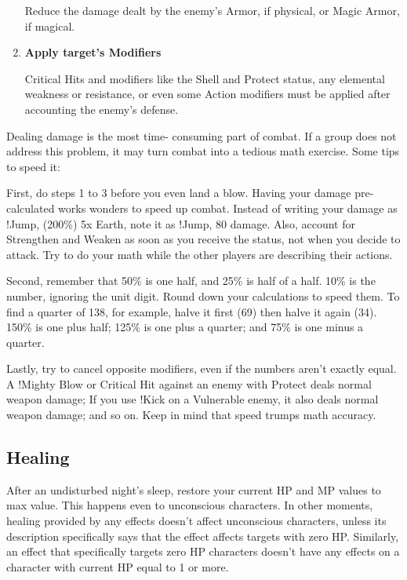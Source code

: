\begin{multicols}{2}
\begin{enumerate}
Reduce the damage dealt by the enemy's
Armor, if physical, or Magic Armor, if magical.

\item \textbf{Apply target's Modifiers}

Critical Hits and modifiers like the Shell and
Protect status, any elemental weakness or
resistance, or even some Action modifiers must be
applied after accounting the enemy's defense.
\end{enumerate}

\begin{boco}
Dealing damage is the most time-
consuming part of combat. If a group does not
address this problem, it may turn combat into a
tedious math exercise. Some tips to speed it:

First, do steps 1 to 3 before you even land
a blow. Having your damage pre-calculated
works wonders to speed up combat. Instead of
writing your damage as !Jump, (200\%) 5x Earth,
note it as !Jump, 80 damage. Also, account for
Strengthen and Weaken as soon as you receive
the status, not when you decide to attack. Try to
do your math while the other players are
describing their actions.

Second, remember that 50\% is one half,
and 25\% is half of a half. 10\% is the number,
ignoring the unit digit. Round down your
calculations to speed them. To find a quarter of
138, for example, halve it first (69) then halve it
again (34). 150\% is one plus half; 125\% is one
plus a quarter; and 75\% is one minus a quarter.

Lastly, try to cancel opposite modifiers,
even if the numbers aren't exactly equal.
A !Mighty Blow or Critical Hit against an enemy
with Protect deals normal weapon damage; If you
use !Kick on a Vulnerable enemy, it also deals
normal weapon damage; and so on. Keep in mind
that speed trumps math accuracy.
\end{boco}

\subsection{Healing}
\label{subsec:heal}
After an undisturbed night's sleep, restore
your current HP and MP values to max value. This
happens even to unconscious characters. In other
moments, healing provided by any effects doesn’t
affect unconscious characters, unless its
description specifically says that the effect affects
targets with zero HP. Similarly, an effect that
specifically targets zero HP characters doesn’t
have any effects on a character with current HP
equal to 1 or more.
\end{multicols}

